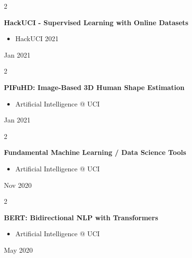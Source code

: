 \documentclass[10pt, letterpaper]{article}
\newenvironment{highlights}{
    \begin{itemize}[
        topsep=0.10 cm,
        parsep=0.10 cm,
        partopsep=0pt,
        itemsep=0pt,
        leftmargin=0.4 cm + 10pt
    ]
}{
    \end{itemize}
} %
\newenvironment{twocolentry}[2][]{
    \onecolentry
    \def\secondColumn{#2}
    \setcolumnwidth{\fill, 4.5 cm}
    \begin{paracol}{2}
}{
    \switchcolumn \raggedleft \secondColumn
    \end{paracol}
    \endonecolentry
} %
\begin{document}
        \vspace{0.2 cm}

        \begin{twocolentry}{
            Jan 2021
        }
            \textbf{HackUCI - Supervised Learning with Online Datasets}
            \begin{highlights}
                \item HackUCI 2021
            \end{highlights}
        \end{twocolentry}


        \vspace{0.2 cm}

        \begin{twocolentry}{
            Jan 2021
        }
            \textbf{PIFuHD: Image-Based 3D Human Shape Estimation}
            \begin{highlights}
                \item Artificial Intelligence @ UCI
            \end{highlights}
        \end{twocolentry}


        \vspace{0.2 cm}

        \begin{twocolentry}{
            Nov 2020
        }
            \textbf{Fundamental Machine Learning / Data Science Tools}
            \begin{highlights}
                \item Artificial Intelligence @ UCI
            \end{highlights}
        \end{twocolentry}


        \vspace{0.2 cm}

        \begin{twocolentry}{
            May 2020
        }
            \textbf{BERT: Bidirectional NLP with Transformers}
            \begin{highlights}
                \item Artificial Intelligence @ UCI
            \end{highlights}
        \end{twocolentry}



    
\end{document}
